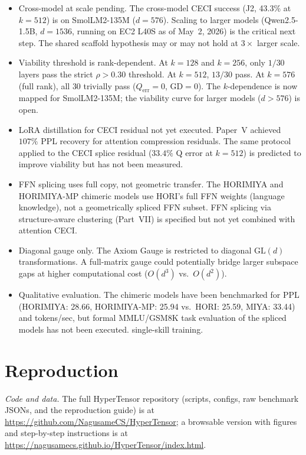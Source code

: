 \documentclass[11pt]{article}
\begin{document}
\begin{itemize}
\item Cross-model at scale pending. The cross-model CECI success
 (J2, 43.3\% at $k{=}512$) is on SmolLM2-135M ($d{=}576$). Scaling
 to larger models (Qwen2.5-1.5B, $d{=}1536$, running on EC2 L40S as
 of May~2, 2026) is the critical next step. The shared scaffold
 hypothesis may or may not hold at $3\times$ larger scale.

\item Viability threshold is rank-dependent. At $k{=}128$ and
 $k{=}256$, only $1/30$ layers pass the strict $\rho{>}0.30$ threshold.
 At $k{=}512$, $13/30$ pass. At $k{=}576$ (full rank), all $30$
 trivially pass ($Q_{\text{err}}{=}0$, GD${=}0$). The $k$-dependence
 is now mapped for SmolLM2-135M; the viability curve for larger models
 ($d{>}576$) is open.

\item LoRA distillation for CECI residual not yet executed.
 Paper~V achieved $107\%$ PPL recovery for attention compression
 residuals. The same protocol applied to the CECI splice residual
 ($33.4\%$ Q error at $k{=}512$) is predicted to improve viability but
 has not been measured.

\item FFN splicing uses full copy, not geometric transfer. The
 HORIMIYA and HORIMIYA-MP chimeric models use HORI's full FFN weights
 (language knowledge), not a geometrically spliced FFN subset. FFN
 splicing via structure-aware clustering (Part~VII) is specified but
 not yet combined with attention CECI.

\item Diagonal gauge only. The Axiom Gauge is restricted to
 diagonal $\mathrm{GL}(d)$ transformations. A full-matrix gauge
 could potentially bridge larger subspace gaps at higher
 computational cost ($O(d^3)$ vs.\ $O(d^2)$).

\item Qualitative evaluation. The chimeric models have been
 benchmarked for PPL (HORIMIYA: 28.66, HORIMIYA-MP: 25.94 vs.\
 HORI: 25.59, MIYA: 33.44) and tokens/sec, but formal MMLU/GSM8K
 task evaluation of the spliced models has not been executed.
 single-skill training.
\end{itemize}

\section{Reproduction}
\smallskip\noindent\textit{Code and data.} The full HyperTensor repository (scripts, configs, raw benchmark JSONs, and the reproduction guide) is at \url{https://github.com/NagusameCS/HyperTensor}; a browsable version with figures and step-by-step instructions is at \url{https://nagusamecs.github.io/HyperTensor/index.html}.
\end{document}
